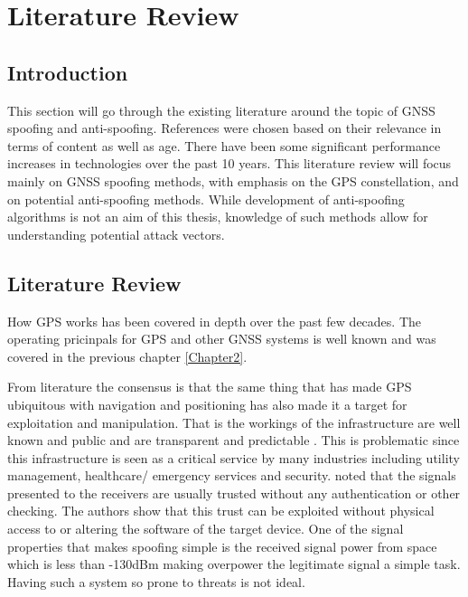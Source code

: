 
\chapter{Literature Review} %

\label{Chapter3} %


\section{Introduction}
This section will go through the existing literature around the topic of GNSS spoofing and anti-spoofing. References were chosen based on their relevance in terms of
content as well as age. There have been some significant performance increases in technologies over the past 10 years.
This literature review will focus mainly on GNSS spoofing methods, with emphasis on the GPS constellation, and on potential anti-spoofing methods. While development of
anti-spoofing algorithms is not an aim of this thesis, knowledge of such methods allow for understanding potential attack vectors.

\section{Literature Review}
How GPS works has been covered in depth over the past few decades. The operating pricinpals for GPS and other GNSS systems is well known and was covered in the previous
chapter \ref{Chapter2}.

From literature the consensus is that the same thing that has made GPS ubiquitous with navigation and 
positioning has also made it a target for exploitation and manipulation. That is the workings
of the infrastructure are well known and public and are transparent and predictable \cite{RN7} \cite{RN4}. This is problematic since this infrastructure
is seen as a critical service by many industries including utility management, healthcare/ emergency services and security. \textcite{RN28} noted that the signals
presented to the receivers are usually trusted without any authentication or other checking. The authors show that this trust can be exploited without physical access to
or altering the software of the target device. One of the signal properties that makes spoofing simple is the received signal power from space which is less than -130dBm
making overpower the legitimate signal a simple task. Having such a system so prone to threats is not ideal. 

